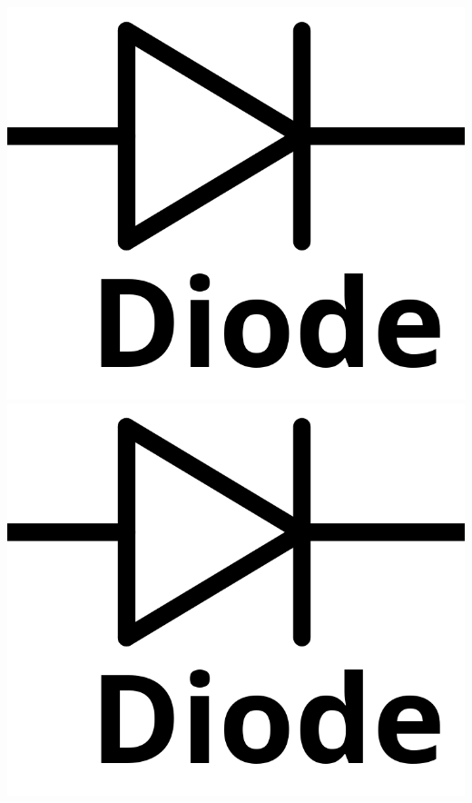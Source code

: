 \documentclass{scrartcl}
\begin{document}
{\begin{minipage}{\textwidth}
			\includegraphics[scale=0.09]{Diode.png}\hspace{0.3cm}
			\includegraphics[scale=0.09]{Diode.png}\\
		\end{minipage}
	}
\end{document}
